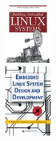 \begin{frame}
\begin{columns}
    \includegraphics[width=0.7\textwidth]{slides/sysdev-embedded-linux/book-building-embedded-linux-systems.png}\\
    \includegraphics[width=0.7\textwidth]{slides/sysdev-embedded-linux/book-embedded-linux-sysdev.png}\\
  \end{columns}
\end{frame}

